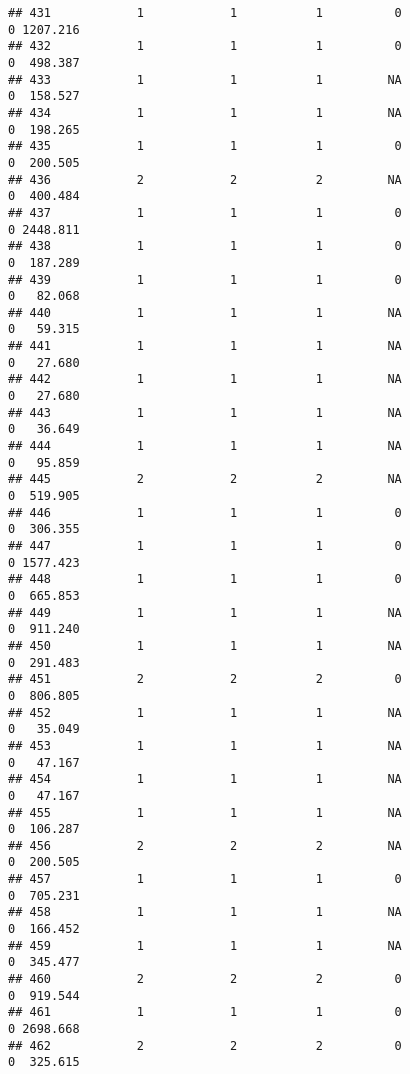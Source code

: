 \documentclass[
]{article}
\begin{document}
\begin{verbatim}
## 431            1            1           1          0                0 1207.216
## 432            1            1           1          0                0  498.387
## 433            1            1           1         NA                0  158.527
## 434            1            1           1         NA                0  198.265
## 435            1            1           1          0                0  200.505
## 436            2            2           2         NA                0  400.484
## 437            1            1           1          0                0 2448.811
## 438            1            1           1          0                0  187.289
## 439            1            1           1          0                0   82.068
## 440            1            1           1         NA                0   59.315
## 441            1            1           1         NA                0   27.680
## 442            1            1           1         NA                0   27.680
## 443            1            1           1         NA                0   36.649
## 444            1            1           1         NA                0   95.859
## 445            2            2           2         NA                0  519.905
## 446            1            1           1          0                0  306.355
## 447            1            1           1          0                0 1577.423
## 448            1            1           1          0                0  665.853
## 449            1            1           1         NA                0  911.240
## 450            1            1           1         NA                0  291.483
## 451            2            2           2          0                0  806.805
## 452            1            1           1         NA                0   35.049
## 453            1            1           1         NA                0   47.167
## 454            1            1           1         NA                0   47.167
## 455            1            1           1         NA                0  106.287
## 456            2            2           2         NA                0  200.505
## 457            1            1           1          0                0  705.231
## 458            1            1           1         NA                0  166.452
## 459            1            1           1         NA                0  345.477
## 460            2            2           2          0                0  919.544
## 461            1            1           1          0                0 2698.668
## 462            2            2           2          0                0  325.615

\end{verbatim}
\end{document}
